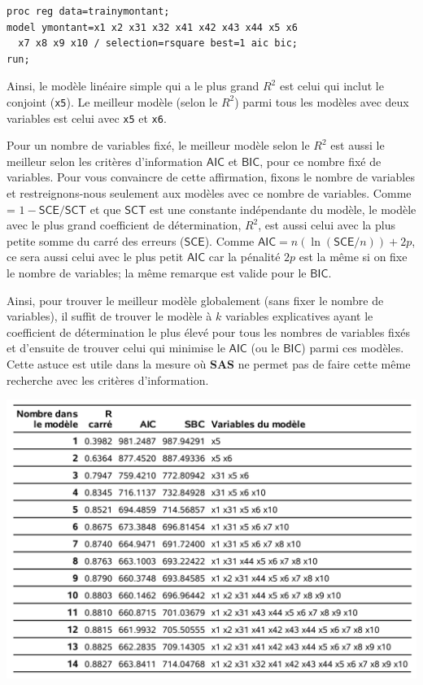 \documentclass[
  11pt,
  letterpaper,
]{book}
\theoremstyle{definition}
\theoremstyle{definition}
\theoremstyle{definition}
\theoremstyle{remark}
\begin{document}
\begin{verbatim}
proc reg data=trainymontant;
model ymontant=x1 x2 x31 x32 x41 x42 x43 x44 x5 x6 
  x7 x8 x9 x10 / selection=rsquare best=1 aic bic;
run;
\end{verbatim}

Ainsi, le modèle linéaire simple qui a le plus grand \(R^2\) est celui qui inclut le conjoint (\texttt{x5}). Le meilleur modèle (selon le \(R^2\)) parmi tous les modèles avec deux variables est celui avec \texttt{x5} et \texttt{x6}.

Pour un nombre de variables fixé, le meilleur modèle selon le \(R^2\) est aussi le meilleur selon les critères d'information \(\mathsf{AIC}\) et \(\mathsf{BIC}\), pour ce nombre fixé de variables. Pour vous convaincre de cette affirmation, fixons le nombre de variables et restreignons-nous seulement aux modèles avec ce nombre de variables. Comme = \(1 - \mathsf{SCE}/\mathsf{SCT}\) et que \(\mathsf{SCT}\) est une constante indépendante du modèle, le modèle avec le plus grand coefficient de détermination, \(R^2\), est aussi celui avec la plus petite somme du carré des erreurs (\(\mathsf{SCE}\)). Comme \(\mathsf{AIC}=n (\ln (\mathsf{SCE}/n)) + 2p\), ce sera aussi celui avec le plus petit \(\mathsf{AIC}\) car la pénalité \(2p\) est la même si on fixe le nombre de variables; la même remarque est valide pour le \(\mathsf{BIC}\).

Ainsi, pour trouver le meilleur modèle globalement (sans fixer le nombre de variables), il suffit de trouver le modèle à \(k\) variables explicatives ayant le coefficient de détermination le plus élevé pour tous les nombres de variables fixés et d'ensuite de trouver celui qui minimise le \(\mathsf{AIC}\) (ou le \(\mathsf{BIC}\)) parmi ces modèles. Cette astuce est utile dans la mesure où \textbf{SAS} ne permet pas de faire cette même recherche avec les critères d'information.

\begin{center}\includegraphics[width=0.9\linewidth]{figures/02-select-e7} \end{center}
\end{document}
